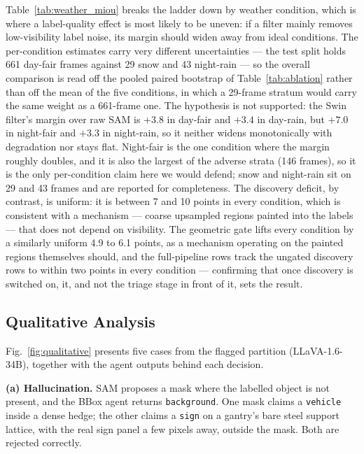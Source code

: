 \documentclass[conference]{IEEEtran}
\begin{document}


Table~\ref{tab:weather_miou} breaks the ladder down by weather condition, which is where a
label-quality effect is most likely to be uneven: if a filter mainly removes low-visibility label
noise, its margin should widen away from ideal conditions.
The per-condition estimates carry very different uncertainties --- the test split holds 661 day-fair
frames against 29 snow and 43 night-rain --- so the overall comparison is read off the pooled paired
bootstrap of Table~\ref{tab:ablation} rather than off the mean of the five conditions, in which a
29-frame stratum would carry the same weight as a 661-frame one.
The hypothesis is not supported: the Swin filter's margin over raw SAM is
$+3.8$ in day-fair and $+3.4$ in day-rain, but $+7.0$ in night-fair and $+3.3$ in night-rain, so it
neither widens monotonically with degradation nor stays flat. Night-fair is the one condition where the
margin roughly doubles, and it is also the largest of the adverse strata (146 frames), so it is the
only per-condition claim here we would defend; snow and night-rain sit on 29 and 43 frames and are
reported for completeness. The discovery deficit, by contrast, is uniform: it is between 7 and 10
points in every condition, which is consistent with a mechanism --- coarse upsampled regions painted
into the labels --- that does not depend on visibility. The geometric gate lifts every condition by a
similarly uniform 4.9 to 6.1 points, as a mechanism operating on the painted regions themselves
should, and the full-pipeline rows track the ungated discovery rows to within two points in every
condition --- confirming that once discovery is switched on, it, and not the triage stage in front of
it, sets the result.



\subsection{Qualitative Analysis}

Fig.~\ref{fig:qualitative} presents five cases from the flagged partition (LLaVA-1.6-34B), together with the agent outputs behind each decision.

\textbf{(a) Hallucination.} SAM proposes a mask where the labelled object is not present, and the BBox agent returns \texttt{background}. One mask claims a \texttt{vehicle} inside a dense hedge; the other claims a \texttt{sign} on a gantry's bare steel support lattice, with the real sign panel a few pixels away, outside the mask. Both are rejected correctly.
\end{document}

